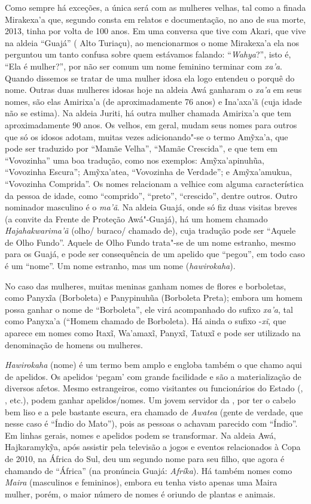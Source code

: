 Como sempre há exceções, a única será com as mulheres velhas, tal como a
finada Mirakexa'a que, segundo consta em relatos e documentação, no ano
de sua morte, 2013, tinha por volta de 100 anos. Em uma conversa que
tive com Akari, que vive na aldeia ``Guajá'' ( Alto Turiaçu), ao
mencionarmos o nome Mirakexa'a ela nos perguntou um tanto confusa sobre
quem estávamos falando: ``\emph{Wahya}?'', isto é, ``Ela é mulher?'',
por não ser comum um nome feminino terminar com \emph{xa'a}. Quando
dissemos se tratar de uma mulher idosa ela logo entendeu o porquê do
nome. Outras duas mulheres idosas hoje na aldeia Awá ganharam o
\emph{xa'a} em seus nomes, são elas Amirixa'a (de aproximadamente 76
anos) e Ina'axa'ã (cuja idade não se estima). Na aldeia Juriti, há outra
mulher chamada Amirixa'a que tem aproximadamente 90 anos. Os velhos, em
geral, mudam seus nomes para outros que só os idosos adotam, muitas
vezes adicionando"-se o termo Amỹxa'a, que pode ser traduzido por ``Mamãe
Velha'', ``Mamãe Crescida'', e que tem em ``Vovozinha'' uma boa
tradução, como nos exemplos: Amỹxa'apinuhũa, ``Vovozinha Escura'';
Amỹxa'atea, ``Vovozinha de Verdade''; e Amỹxa'amukua, ``Vovozinha
Comprida''. Os nomes relacionam a velhice com alguma característica da
pessoa de idade, como ``comprido'', ``preto'', ``crescido'', dentre
outros. Outro nominador masculino é o \emph{ma'ã}. Na aldeia Guajá, onde
só fiz duas visitas breves (a convite da Frente de Proteção Awá"-Guajá),
há um homem chamado \emph{Hajahakwarima'ã} (olho/ buraco/ chamado de),
cuja tradução pode ser ``Aquele de Olho Fundo''. Aquele de Olho Fundo
trata"-se de um nome estranho, mesmo para os Guajá, e pode ser
consequência de um apelido que ``pegou'', em todo caso é um ``nome''. Um
nome estranho, mas um nome (\emph{hawirokaha}).

No caso das mulheres, muitas meninas ganham nomes de flores e
borboletas, como Panyxĩa (Borboleta) e Panypinuhũa (Borboleta Preta);
embora um homem possa ganhar o nome de ``Borboleta'', ele virá
acompanhado do sufixo \emph{xa'a}, tal como Panyxa'a (``Homem chamado de
Borboleta). Há ainda o sufixo -\emph{xĩ}, que aparece em nomes como
Itaxĩ, Wa'amaxĩ, Panyxĩ, Tatuxĩ e pode ser utilizado na denominação de
homens ou mulheres.

\emph{Hawirokaha} (nome) é um termo bem amplo e engloba também o que
chamo aqui de apelidos. Os apelidos `pegam' com grande facilidade e são
a materialização de diversos afetos. Mesmo estrangeiros, como visitantes
ou funcionários do Estado (, , etc.), podem ganhar
apelidos/nomes. Um jovem servidor da , por ter o cabelo bem liso e
a pele bastante escura, era chamado de \emph{Awatea} (gente de verdade,
que nesse caso é ``Índio do Mato''), pois as pessoas o achavam parecido
com ``Índio''. Em linhas gerais, nomes e apelidos podem se transformar.
Na aldeia Awá, Hajkaramykỹa, após assistir pela televisão a jogos
e eventos relacionados à Copa de 2010, na África do Sul, deu um segundo
nome para seu filho, que agora é chamando de ``África'' (na pronúncia
Guajá: \emph{Afríka}). Há também nomes como \emph{Maira} (masculinos e
femininos), embora eu tenha visto apenas uma Maira mulher, porém, o
maior número de nomes é oriundo de plantas e animais.

